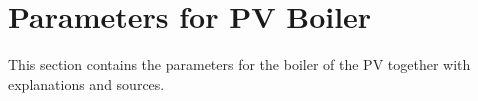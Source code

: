 \section{Parameters for PV Boiler}

This section contains the parameters for the boiler of the PV together with explanations and sources.